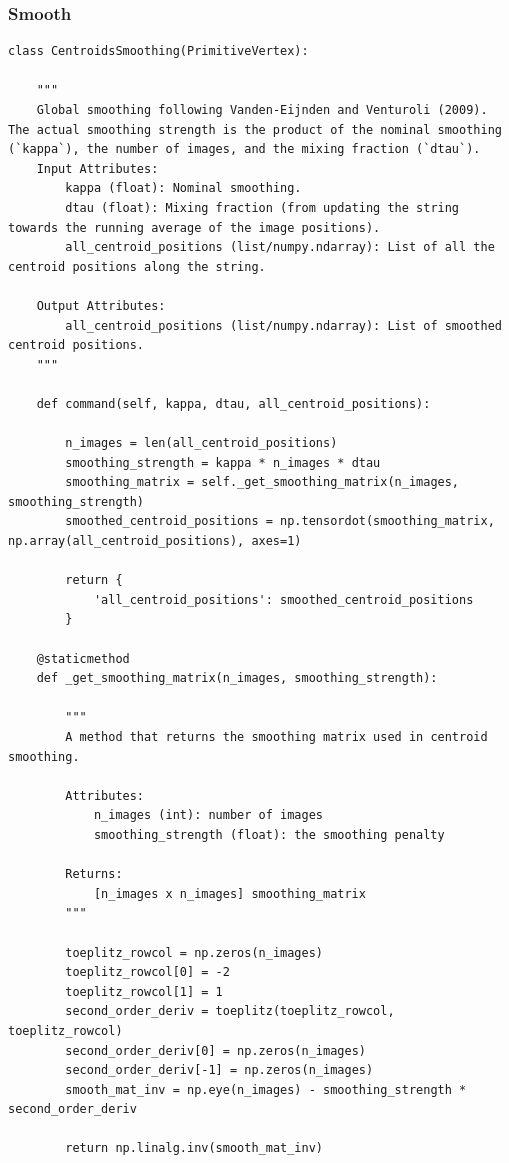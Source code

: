 \documentclass{article}
\begin{document}
{\subsubsection{Smooth}

\begin{lstlisting}
class CentroidsSmoothing(PrimitiveVertex):

    """
    Global smoothing following Vanden-Eijnden and Venturoli (2009). The actual smoothing strength is the product of the nominal smoothing (`kappa`), the number of images, and the mixing fraction (`dtau`).
    Input Attributes:
        kappa (float): Nominal smoothing.
        dtau (float): Mixing fraction (from updating the string towards the running average of the image positions).
        all_centroid_positions (list/numpy.ndarray): List of all the centroid positions along the string.

    Output Attributes:
        all_centroid_positions (list/numpy.ndarray): List of smoothed centroid positions.
    """

    def command(self, kappa, dtau, all_centroid_positions):

        n_images = len(all_centroid_positions)
        smoothing_strength = kappa * n_images * dtau
        smoothing_matrix = self._get_smoothing_matrix(n_images, smoothing_strength)
        smoothed_centroid_positions = np.tensordot(smoothing_matrix, np.array(all_centroid_positions), axes=1)

        return {
            'all_centroid_positions': smoothed_centroid_positions
        }

    @staticmethod
    def _get_smoothing_matrix(n_images, smoothing_strength):

        """
        A method that returns the smoothing matrix used in centroid smoothing.

        Attributes:
            n_images (int): number of images
            smoothing_strength (float): the smoothing penalty

        Returns:
            [n_images x n_images] smoothing_matrix
        """

        toeplitz_rowcol = np.zeros(n_images)
        toeplitz_rowcol[0] = -2
        toeplitz_rowcol[1] = 1
        second_order_deriv = toeplitz(toeplitz_rowcol, toeplitz_rowcol)
        second_order_deriv[0] = np.zeros(n_images)
        second_order_deriv[-1] = np.zeros(n_images)
        smooth_mat_inv = np.eye(n_images) - smoothing_strength * second_order_deriv

        return np.linalg.inv(smooth_mat_inv)
\end{lstlisting} 

}
\end{document}
